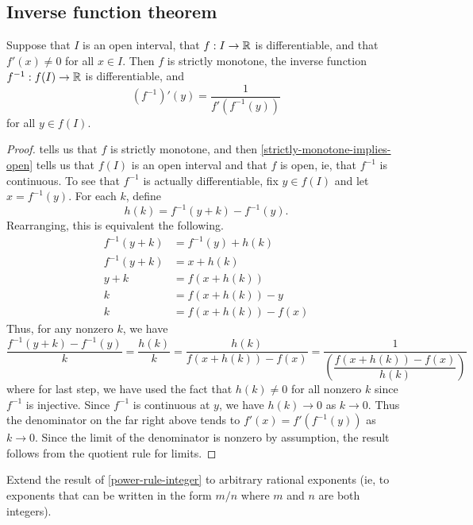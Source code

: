 \subsection{Inverse function theorem}

\begin{theorem} \label{inverse-function-theorem-single}
	Suppose that $I$ is an open interval, that $f : I \to \mathbb{R}$ is differentiable, and that $f'(x) \neq 0$ for all $x \in I$. Then $f$ is strictly monotone, the inverse function $f^{-1} : f(I) \to \mathbb{R}$ is differentiable, and 
	\[ (f^{-1})'(y) = \frac{1}{f'(f^{-1}(y))} \]
	for all $y \in f(I)$. 
\end{theorem}

\begin{proof}
	 tells us that $f$ is strictly monotone, and then \cref{strictly-monotone-implies-open} tells us that $f(I)$ is an open interval and that $f$ is open, ie, that $f^{-1}$ is continuous. To see that $f^{-1}$ is actually differentiable, fix $y \in f(I)$ and let $x = f^{-1}(y)$. For each $k$, define \[ h(k) = f^{-1}(y + k) - f^{-1}(y). \]
	Rearranging, this is equivalent the following. 
	\[ \begin{aligned} f^{-1}(y + k) &= f^{-1}(y) + h(k) \\
	f^{-1}(y + k) &= x + h(k) \\
	y + k &= f(x + h(k)) \\
	k &= f(x + h(k)) - y \\
	k &= f(x+h(k)) - f(x) \end{aligned} \]
	Thus, for any nonzero $k$, we have
	\[ \frac{f^{-1}(y + k) - f^{-1}(y)}{k} = \frac{h(k)}{k} = \frac{h(k)}{f(x + h(k)) - f(x)} = \frac{1}{ \left( \dfrac{f(x + h(k)) - f(x)}{h(k)} \right) } \]
	where for last step, we have used the fact that $h(k) \neq 0$ for all nonzero $k$ since $f^{-1}$ is injective. Since $f^{-1}$ is continuous at $y$, we have $h(k) \to 0$ as $k \to 0$. Thus the denominator on the far right above tends to $f'(x) = f'(f^{-1}(y))$ as $k \to 0$. Since the limit of the denominator is nonzero by assumption, the result follows from the quotient rule for limits. 
\end{proof}

\begin{exercise} \label{power-rule-fractional} 
	Extend the result of \cref{power-rule-integer} to arbitrary rational exponents (ie, to exponents that can be written in the form $m/n$ where $m$ and $n$ are both integers). 
\end{exercise}

